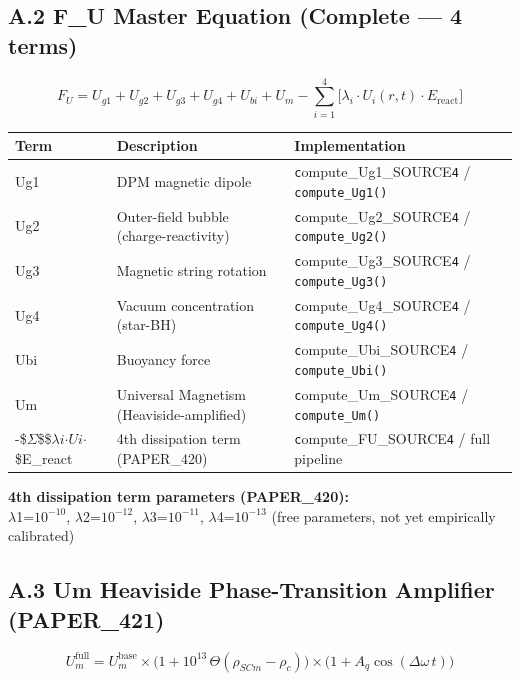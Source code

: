 \documentclass[12pt,a4paper]{article}
\begin{document}
\subsection{A.2 F\_U Master Equation (Complete --- 4 terms)}

\begin{equation}
F_U = U_{g1} + U_{g2} + U_{g3} + U_{g4} + U_{bi} + U_m - \sum_{i=1}^{4}\bigl[\lambda_i \cdot U_i(r,t) \cdot E_{\mathrm{react}}\bigr]
\end{equation}

\begin{table}[H]
\centering
\small
\begin{tabularx}{\linewidth}{@{}>{\raggedright\arraybackslash}X>{\raggedright\arraybackslash}X>{\raggedright\arraybackslash}X@{}}
\toprule
Term & Description & Implementation \tabularnewline
\midrule
Ug1 & DPM magnetic dipole & \texttt{c}ompute\_{Ug1\_SOURCE}\texttt{4} / \texttt{compute\_Ug1()} \tabularnewline
Ug2 & Outer-field bubble (charge-reactivity) & \texttt{c}ompute\_{Ug2\_SOURCE}\texttt{4} / \texttt{compute\_Ug2()} \tabularnewline
Ug3 & Magnetic string rotation & \texttt{c}ompute\_{Ug3\_SOURCE}\texttt{4} / \texttt{compute\_Ug3()} \tabularnewline
Ug4 & Vacuum concentration (star-BH) & \texttt{c}ompute\_{Ug4\_SOURCE}\texttt{4} / \texttt{compute\_Ug4()} \tabularnewline
Ubi & Buoyancy force & \texttt{c}ompute\_{Ubi\_SOURCE}\texttt{4} / \texttt{compute\_Ubi()} \tabularnewline
Um & Universal Magnetism (Heaviside-amplified) & \texttt{c}ompute\_{Um\_SOURCE}\texttt{4} / \texttt{compute\_Um()} \tabularnewline
-\$$\Sigma$\$\$$\lambda$$i$$\cdot$$Ui$$\cdot$\$E\_react & 4th dissipation term (PAPER\_420) & \texttt{c}ompute\_{FU\_SOURCE}\texttt{4} / full pipeline \tabularnewline
\bottomrule
\end{tabularx}
\end{table}

\textbf{4th dissipation term parameters (PAPER\_420):} \\  $\lambda$1=$10^{-10}$, $\lambda$2=$10^{-12}$, $\lambda$3=$10^{-11}$, $\lambda$4=$10^{-13}$ (free parameters, not yet empirically calibrated)

\subsection{A.3 Um Heaviside Phase-Transition Amplifier (PAPER\_421)}

\begin{equation}
U_m^{\mathrm{full}} = U_m^{\mathrm{base}} \times \bigl(1 + 10^{13}\,\Theta(\rho_{SCm} - \rho_c)\bigr) \times \bigl(1 + A_q\cos(\Delta\omega\,t)\bigr)
\end{equation}
\end{document}
